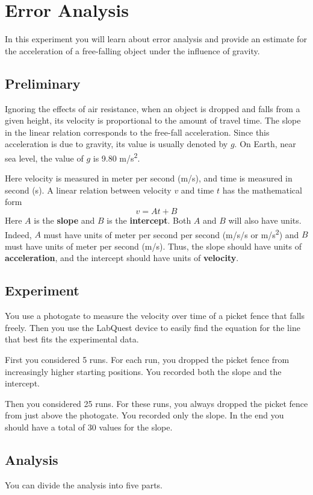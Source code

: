 \chapter{Error Analysis}
%
In this experiment you will learn about error analysis and provide an estimate for the acceleration of a free-falling object under the influence of gravity.
%
\section{Preliminary}
%
Ignoring the effects of air resistance, when an object is dropped and falls from a given height, its velocity is proportional to the amount of travel time. The slope in the linear relation corresponds to the free-fall acceleration. Since this acceleration is due to gravity, its value is usually denoted by $g$. On Earth, near sea level, the value of $g$ is 9.80 m/s\textsuperscript{2}.

Here velocity is measured in meter per second (m/s), and time is measured in second (s). A linear relation between velocity $v$ and time $t$ has the mathematical form
\begin{equation}
    v = A t + B
\end{equation}
Here $A$ is the \textbf{slope} and $B$ is the \textbf{intercept}. Both $A$ and $B$ will also have units. Indeed, $A$ must have units of meter per second per second (m/s/s or m/s\textsuperscript{2}) and $B$ must have units of meter per second (m/s). Thus, the slope should have units of \textbf{acceleration}, and the intercept should have units of \textbf{velocity}.
%
\section{Experiment}
%
You use a photogate to measure the velocity over time of a picket fence that falls freely. Then you use the LabQuest device to easily find the equation for the line that best fits the experimental data.

First you considered 5 runs. For each run, you dropped the picket fence from increasingly higher starting positions. You recorded both the slope and the intercept.

Then you considered 25 runs. For these runs, you always dropped the picket fence from just above the photogate. You recorded only the slope. In the end you should have a total of 30 values for the slope.
%
\section{Analysis}
%
You can divide the analysis into five parts.
%
